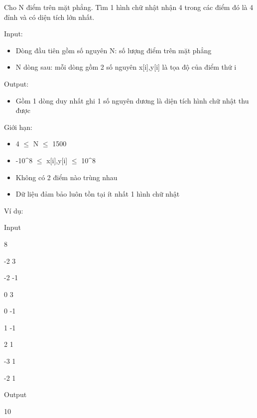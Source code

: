 



    Cho N điểm trên mặt phẳng. Tìm 1 hình chữ nhật nhận 4 trong các điểm đó là 4 đỉnh và có diện tích lớn nhất.   

    Input:   
\begin{itemize}
	\item 

      Dòng  đầu tiên gồm số nguyên N: số lượng điểm trên mặt  phẳng     
	\item 

      N  dòng sau: mỗi dòng gồm 2 số nguyên x[i],y[i] là tọa độ  của điểm thứ i     
\end{itemize}

    Output:   
\begin{itemize}
	\item 

      Gồm  1 dòng duy nhất ghi 1 số nguyên dương là diện tích hình  chữ nhật thu được     
\end{itemize}



    Giới hạn:   
\begin{itemize}
	\item 

      4   $\le$  N  $\le$  1500     
	\item 

      -10^8   $\le$  x[i],y[i]  $\le$  10^8     
	\item 

      Không  có 2 điểm nào trùng nhau     
	\item 

      Dữ  liệu đảm bảo luôn tồn tại ít nhất 1 hình chữ nhật     
\end{itemize}



    Ví dụ:   

        Input       

        8       

        -2 3       

        -2 -1       

        0 3       

        0 -1       

        1 -1       

        2 1       

        -3 1       

        -2 1       

        Output       

        10       
